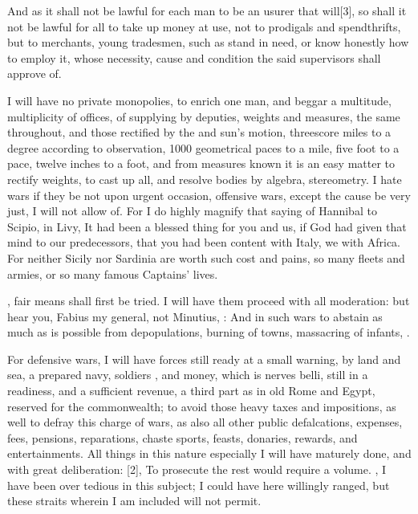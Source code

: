 {And as it shall not be lawful for each man to be an usurer that
will[3\baselineskip], so shall it not be lawful for all to take up money at use, not to
prodigals and spendthrifts, but to merchants, young tradesmen, such as
stand in need, or know honestly how to employ it, whose necessity,
cause and condition the said supervisors shall approve of.

I will have no private monopolies, to enrich one man, and beggar a
multitude, multiplicity of offices, of supplying by deputies,
weights and measures, the same throughout, and those rectified by the
 and sun's motion, threescore miles to a degree according
to observation, 1000 geometrical paces to a mile, five foot to a pace,
twelve inches to a foot, \etc{} and from measures known it is an easy
matter to rectify weights, \etc{} to cast up all, and resolve bodies by
algebra, stereometry. I hate wars if they be not  upon
urgent occasion, 
offensive wars, except the cause be very just, I will not allow
of. For I do highly magnify that saying of Hannibal to Scipio, in
Livy, It had been a blessed thing for you and us, if God had given
that mind to our predecessors, that you had been content with Italy, we
with Africa. For neither Sicily nor Sardinia are worth such cost and
pains, so many fleets and armies, or so many famous Captains' lives.

, fair means shall first be tried.  I will have them proceed
with all moderation: but hear you, Fabius my general, not Minutius, : And in such wars to abstain as much as is possible
from depopulations, burning of towns, massacring of infants, \etc{}.

For defensive wars, I will have forces still ready at a small warning,
by land and sea, a prepared navy, soldiers , and money,
which is nerves belli, still in a readiness, and a sufficient revenue,
a third part as in old Rome and Egypt, reserved for the
commonwealth; to avoid those heavy taxes and impositions, as well to
defray this charge of wars, as also all other public defalcations,
expenses, fees, pensions, reparations, chaste sports, feasts, donaries,
rewards, and entertainments. All things in this nature especially I
will have maturely done, and with great deliberation: [2\baselineskip], 
To prosecute the rest would require a volume. , I have
been over tedious in this subject; I could have here willingly ranged,
but these straits wherein I am included will not permit.

}
